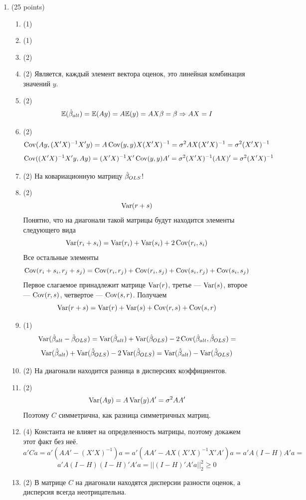 \documentclass[12pt, a4paper]{article}
\begin{document}
\begin{enumerate}

\item (25 points)
\begin{enumerate}
  \item (1)
  \item (1)
  \item (2)
  \item (2) Является, каждый элемент вектора оценок, это линейная комбинация значений $y$.
  \item (2)
\[
\mathbb{E} (\hat{\beta}_{alt}) = \mathbb{E} (Ay) = A\mathbb{E}(y) = AX\beta = \beta \Rightarrow AX = I
\]
  \item (2)
\[
\operatorname{Cov} (Ay, (X'X)^{-1}X'y) = A  \operatorname{Cov}(y, y) X (X'X)^{-1} = \sigma^2 AX(X'X)^{-1} = \sigma^2 (X'X)^{-1}
\]
\[
\operatorname{Cov} ((X'X)^{-1}X'y, Ay) = (X'X)^{-1}X' \operatorname{Cov}(y, y) A' = \sigma^2 (X'X)^{-1} (AX)' = \sigma^2 (X'X)^{-1}
\]
  \item (2)
На ковариационную матрицу $\hat{\beta}_{OLS}$!
  \item (2)
\[
\operatorname{Var} (r + s)
\]
Понятно, что на диагонали такой матрицы будут находится элементы следующего вида
\[
\operatorname{Var}(r_i + s_i) = \operatorname{Var} (r_i) + \operatorname{Var} (s_i) + 2\operatorname{Cov} (r_i, s_i)
\]
Все остальные элементы
\[
\operatorname{Cov}(r_i + s_i, r_j + s_j) = \operatorname{Cov}(r_i, r_j) + \operatorname{Cov}(r_i, s_j) +  \operatorname{Cov}(s_i, r_j) +  \operatorname{Cov}(s_i, s_j)
\]
Первое слагаемое принадлежит матрице $\operatorname{Var} (r)$, третье — $\operatorname{Var}(s)$, второе — $\operatorname{Cov}(r,s)$, четвертое — $\operatorname{Cov}(s,r)$. Получаем
\[
\operatorname{Var}(r + s) = \operatorname{Var}(r) + \operatorname{Var} (s) + \operatorname{Cov}(r,s) + \operatorname{Cov}(s,r)
\]
  \item (1)
\[
\operatorname{Var} (\hat{\beta}_{alt} - \hat{\beta}_{OLS}) = \operatorname{Var}(\hat{\beta}_{alt}) + \operatorname{Var}(\hat{\beta}_{OLS}) - 2\operatorname{Cov} (\hat{\beta}_{alt}, \hat{\beta}_{OLS}) =
\]
\[
\operatorname{Var}(\hat{\beta}_{alt}) + \operatorname{Var}(\hat{\beta}_{OLS}) - 2\operatorname{Var}(\hat{\beta}_{OLS}) = \operatorname{Var}(\hat{\beta}_{alt}) - \operatorname{Var}(\hat{\beta}_{OLS})
\]
  \item (2)
На диагонали находится разница в дисперсиях коэффициентов.
  \item (2)
\[
\operatorname{Var} (Ay) = A \operatorname{Var}(y) A' = \sigma^2 AA'
\]
Поэтому $C$ симметрична,  как разница симметричных матриц.

  \item (4)
Константа не влияет на определенность матрицы, поэтому докажем этот факт без неё.
\[
a'Ca = a'(AA' - (X'X)^{-1})a = a'(AA' - AX(X'X)^{-1}X'A')a = a'A(I - H)A'a =
\]
\[
 a'A(I - H)(I - H)'A'a = ||(I - H)'A'a||^2_2 \geq 0
\]
  \item (2)
В матрице $C$ на диагонали находятся дисперсии разности оценок, а дисперсия всегда неотрицательна.
\end{enumerate}


\end{enumerate}
\end{document}

